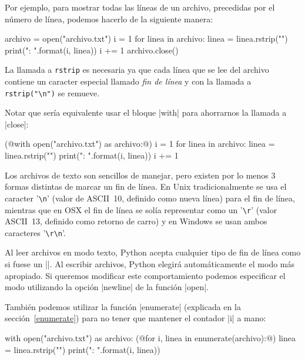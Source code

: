 Por ejemplo, para mostrar todas las líneas de un archivo,
precedidas por el número de línea, podemos hacerlo de la siguiente manera:

\begin{codigo-python-sn}
archivo = open("archivo.txt")
i = 1
for linea in archivo:
    linea = linea.rstrip("\n")
    print("{}: {}".format(i, linea))
    i += 1
archivo.close()
\end{codigo-python-sn}

La llamada a \lstinline!rstrip! es necesaria ya que cada línea que se lee del
archivo contiene un caracter especial llamado \emph{fin de línea} y con la llamada a
\lstinline!rstrip("\n")! se remueve.

Notar que sería equivalente usar el bloque |with| para ahorrarnos la llamada a
|close|:

\begin{codigo-python-sn}
(@with open("archivo.txt") as archivo:@)
    i = 1
    for linea in archivo:
        linea = linea.rstrip("\n")
        print("{}: {}".format(i, linea))
        i += 1
\end{codigo-python-sn}

\begin{sabias_que}
Los archivos de texto son sencillos de manejar, pero existen por lo menos 3
formas distintas de marcar un fin de línea. En Unix tradicionalmente se usa
el caracter '\verb!\n!' (valor de ASCII~10, definido como nueva línea) para
el fin de línea, mientras que en OSX el fin de línea se solía
representar como un '\verb!\r!' (valor ASCII~13, definido como retorno de
carro) y en Windows se usan ambos caracteres '\verb!\r\n!'.

Al leer archivos en modo texto, Python acepta cualquier tipo de fin
de línea como si fuese un |\n|. Al escribir archivos, Python elegirá
automáticamente el modo más apropiado. Si queremos modificar este
comportamiento podemos especificar el modo utilizando la opción |newline| de la
función |open|.
\end{sabias_que}

También podemos utilizar la función |enumerate| (explicada en la
sección~\ref{enumerate}) para no tener que mantener el
contador |i| a mano:

\begin{codigo-python-sn}
with open("archivo.txt") as archivo:
    (@for i, linea in enumerate(archivo):@)
        linea = linea.rstrip("\n")
        print("{}: {}".format(i, linea))
\end{codigo-python-sn}

